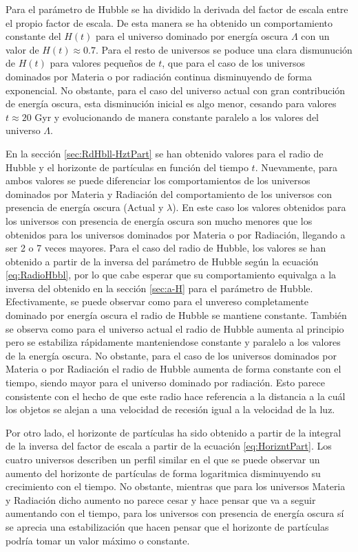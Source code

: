 \documentclass[twoside]{article}
\begin{document}
			Para el parámetro de Hubble se ha dividido la derivada del factor de escala entre el propio factor de escala. De esta manera se ha obtenido un comportamiento constante del $H(t)$ para el universo dominado por energía oscura $\Lambda$ con un valor de $H(t) \approx 0.7$. Para el resto de universos se poduce una clara dismunución de $H(t)$ para valores pequeños de $t$, que para el caso de los universos dominados por Materia o por radiación continua disminuyendo de forma exponencial. No obstante, para el caso del universo actual con gran contribución de energía oscura, esta disminución inicial es algo menor, cesando para valores $t \approx 20$ Gyr y evolucionando de manera constante paralelo a los valores del universo $\Lambda$.

			En la sección \ref{sec:RdHbll-HztPart} se han obtenido valores para el radio de Hubble y el horizonte de partículas en función del tiempo $t$. Nuevamente, para ambos valores se puede diferenciar los comportamientos de los universos dominados por Materia y Radiación del comportamiento de los universos con presencia de energía oscura (Actual y $\lambda$). En este caso los valores obtenidos para los universos con presencia de energía oscura son mucho menores que los obtenidos para los universos dominados por Materia o por Radiación, llegando a ser 2 o 7 veces mayores. Para el caso del radio de Hubble, los valores se han obtenido a partir de la inversa del parámetro de Hubble según la ecuación \ref{eq:RadioHbbl}, por lo que cabe esperar que su comportamiento equivalga a la inversa del obtenido en la sección \ref{sec:a-H} para el parámetro de Hubble. Efectivamente, se puede observar como para el unvereso completamente dominado por energía oscura el radio de Hubble se mantiene constante. También se observa como para el universo actual el radio de Hubble aumenta al principio pero se estabiliza rápidamente manteniendose constante y paralelo a los valores de la energía oscura. No obstante, para el caso de los universos dominados por Materia o por Radiación el radio de Hubble aumenta de forma constante con el tiempo, siendo mayor para el universo dominado por radiación. Esto parece consistente con el hecho de que este radio hace referencia a la distancia a la cuál los objetos se alejan a una velocidad de recesión igual a la velocidad de la luz.

			Por otro lado, el horizonte de partículas ha sido obtenido a partir de la integral de la inversa del factor de escala a partir de la ecuación \ref{eq:HorizntPart}. Los cuatro universos describen un perfil similar en el que se puede observar un aumento del horizonte de partículas de forma logaritmica disminuyendo su crecimiento con el tiempo. No obstante, mientras que para los universos Materia y Radiación dicho aumento no parece cesar y hace pensar que va a seguir aumentando con el tiempo, para los universos con presencia de energía oscura sí se aprecia una estabilización que hacen pensar que el horizonte de partículas podría tomar un valor máximo o constante.
\end{document}
